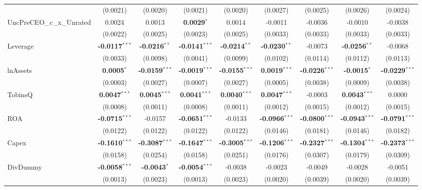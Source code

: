 \documentclass[11pt,a4paper]{article}
\begin{document}
\begin{table}[htbp]
\begin{tabular}{lcccccccc}
 & (0.0021) & (0.0020) & (0.0021) & (0.0020) & (0.0027) & (0.0025) & (0.0026) & (0.0024) \\
UncPreCEO\_c\_x\_Unrated & 0.0024 & 0.0013 & \textbf{0.0029}$^{*}$ & 0.0014 & -0.0011 & -0.0036 & -0.0010 & -0.0038 \\
 & (0.0022) & (0.0025) & (0.0023) & (0.0025) & (0.0033) & (0.0033) & (0.0033) & (0.0033) \\
\midrule
Leverage & \textbf{-0.0117}$^{***}$ & \textbf{-0.0216}$^{**}$ & \textbf{-0.0141}$^{***}$ & \textbf{-0.0214}$^{**}$ & \textbf{-0.0230}$^{**}$ & -0.0073 & \textbf{-0.0256}$^{**}$ & -0.0068 \\
 & (0.0033) & (0.0098) & (0.0041) & (0.0099) & (0.0102) & (0.0114) & (0.0112) & (0.0113) \\
lnAssets & \textbf{0.0005}$^{*}$ & \textbf{-0.0159}$^{***}$ & \textbf{-0.0019}$^{***}$ & \textbf{-0.0155}$^{***}$ & \textbf{0.0019}$^{***}$ & \textbf{-0.0226}$^{***}$ & \textbf{-0.0015}$^{*}$ & \textbf{-0.0229}$^{***}$ \\
 & (0.0003) & (0.0027) & (0.0007) & (0.0027) & (0.0005) & (0.0038) & (0.0009) & (0.0038) \\
TobinsQ & \textbf{0.0047}$^{***}$ & \textbf{0.0045}$^{***}$ & \textbf{0.0041}$^{***}$ & \textbf{0.0040}$^{***}$ & \textbf{0.0047}$^{***}$ & -0.0003 & \textbf{0.0043}$^{***}$ & 0.0000 \\
 & (0.0008) & (0.0011) & (0.0008) & (0.0011) & (0.0012) & (0.0015) & (0.0012) & (0.0015) \\
ROA & \textbf{-0.0715}$^{***}$ & -0.0157 & \textbf{-0.0651}$^{***}$ & -0.0133 & \textbf{-0.0966}$^{***}$ & \textbf{-0.0800}$^{***}$ & \textbf{-0.0943}$^{***}$ & \textbf{-0.0791}$^{***}$ \\
 & (0.0122) & (0.0122) & (0.0122) & (0.0122) & (0.0146) & (0.0181) & (0.0146) & (0.0182) \\
Capex & \textbf{-0.1610}$^{***}$ & \textbf{-0.3087}$^{***}$ & \textbf{-0.1647}$^{***}$ & \textbf{-0.3005}$^{***}$ & \textbf{-0.1206}$^{***}$ & \textbf{-0.2327}$^{***}$ & \textbf{-0.1304}$^{***}$ & \textbf{-0.2373}$^{***}$ \\
 & (0.0158) & (0.0254) & (0.0158) & (0.0251) & (0.0176) & (0.0307) & (0.0179) & (0.0309) \\
DivDummy & \textbf{-0.0058}$^{***}$ & \textbf{-0.0043}$^{*}$ & \textbf{-0.0054}$^{***}$ & -0.0038 & -0.0023 & -0.0049 & -0.0028 & -0.0051 \\
 & (0.0013) & (0.0023) & (0.0013) & (0.0023) & (0.0020) & (0.0039) & (0.0020) & (0.0039) \\

\end{tabular}
\end{table}
\end{document}
